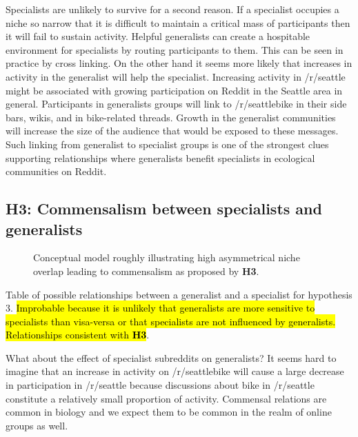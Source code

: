 \documentclass[12pt]{memoir}
\DeclareRobustCommand{\myhl}[2]{\sethlcolor{#1} \hl{#2}}
\begin{document}
Specialists are unlikely to survive for a second reason. If a specialist occupies a niche so narrow that it is difficult to maintain a critical mass of participants then it will fail to sustain activity.  Helpful generalists can create a hospitable environment for specialists by routing participants to them.  This can be seen in practice by cross linking. On the other hand it seems more likely that increases in activity in the generalist will help the specialist.  Increasing activity in /r/seattle might be associated with growing participation on Reddit in the Seattle area in general.  Participants in generalists groups will link to /r/seattlebike in their side bars, wikis, and in bike-related threads. Growth in the generalist communities will increase the size of the audience that would be exposed to these messages.  Such linking from generalist to specialist groups is one of the strongest clues supporting relationships where generalists benefit specialists in ecological communities on Reddit.

\subsection{\textbf{H3:} Commensalism between specialists and generalists}

\begin{figure}[t]

\caption{Conceptual model roughly illustrating high asymmetrical niche overlap leading to commensalism as proposed by \textbf{H3}. \label{fig:H3}}
\end{figure}

\begin{table}[b]
  
\caption{Table of possible relationships between a generalist and a specialist for hypothesis 3. \myhl{nullhypothesizedcell}{Improbable because it is unlikely that generalists are more sensitive to specialists than visa-versa or that specialists are not influenced by generalists.}  \myhl{hypothesizedcell}{Relationships consistent with \textbf{H3}}. \label{tab:H3}}
\end{table}


What about the effect of specialist subreddits on generalists?  It seems hard to imagine that an increase in activity on /r/seattlebike will cause a large decrease in participation in /r/seattle because discussions about bike in /r/seattle constitute a relatively small proportion of activity.  Commensal relations are common in biology and we expect them to be common in the realm of online groups as well.
\end{document}
